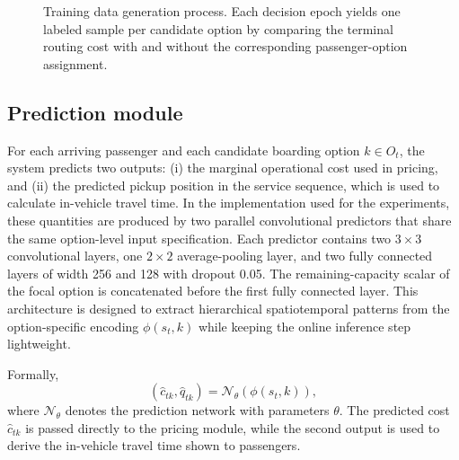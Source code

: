 \documentclass[preprint,12pt,authoryear]{elsarticle}
\begin{document}
\begin{figure}[t]
\centering
{}
\caption{Training data generation process. Each decision epoch yields one labeled sample per candidate option by comparing the terminal routing cost with and without the corresponding passenger-option assignment.}
\label{fig:labels}
\end{figure}

\subsection{Prediction module}

For each arriving passenger and each candidate boarding option $k\in O_t$, the system predicts two outputs: (i) the marginal operational cost used in pricing, and (ii) the predicted pickup position in the service sequence, which is used to calculate in-vehicle travel time. In the implementation used for the experiments, these quantities are produced by two parallel convolutional predictors that share the same option-level input specification. Each predictor contains two $3\times 3$ convolutional layers, one $2\times 2$ average-pooling layer, and two fully connected layers of width 256 and 128 with dropout 0.05. The remaining-capacity scalar of the focal option is concatenated before the first fully connected layer. This architecture is designed to extract hierarchical spatiotemporal patterns from the option-specific encoding $\phi(s_t,k)$ while keeping the online inference step lightweight.

Formally,
\begin{equation}
\left(\hat{c}_{tk}, \hat{q}_{tk}\right) = \mathcal{N}_{\theta}\!\left(\phi(s_t,k)\right),
\tag{13}\label{eq:nn}
\end{equation}
where $\mathcal{N}_{\theta}$ denotes the prediction network with parameters $\theta$. The predicted cost $\hat{c}_{tk}$ is passed directly to the pricing module, while the second output is used to derive the in-vehicle travel time shown to passengers.
\end{document}
